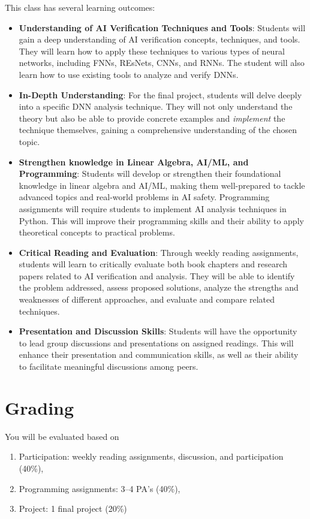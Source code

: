 \documentclass[11pt]{article}
\begin{document}
This class has several learning outcomes:
\begin{itemize}
\item \textbf{Understanding of AI Verification Techniques and Tools}: Students will gain a deep understanding of AI verification concepts, techniques, and tools. They will learn how to apply these techniques to various types of neural networks, including FNNs, REsNets, CNNs, and RNNs.  The student will also learn how to use existing tools to analyze and verify DNNs.

\item \textbf{In-Depth Understanding}: For the final project, students will delve deeply into a specific DNN analysis technique. They will not only understand the theory but also be able to provide concrete examples and \emph{implement} the technique themselves, gaining a comprehensive understanding of the chosen topic.  

\item \textbf{Strengthen knowledge in Linear Algebra, AI/ML, and Programming}: Students will develop or strengthen their foundational knowledge in linear algebra and AI/ML, making them well-prepared to tackle advanced topics and real-world problems in AI safety. 
Programming assignments will require students to implement AI analysis techniques in Python. This will improve their programming skills and their ability to apply theoretical concepts to practical problems.


\item \textbf{Critical Reading and Evaluation}: Through weekly reading assignments, students will learn to critically evaluate both book chapters and research papers related to AI verification and analysis. They will be able to identify the problem addressed, assess proposed solutions, analyze the strengths and weaknesses of different approaches, and evaluate and compare related techniques.

\item \textbf{Presentation and Discussion Skills}: Students will have the opportunity to lead group discussions and presentations on assigned readings. This will enhance their presentation and communication skills, as well as their ability to facilitate meaningful discussions among peers.

\end{itemize}

\section{Grading}
You will be evaluated based on
\begin{enumerate}
\item Participation:  weekly reading assignments, discussion, and participation (40\%),
\item Programming assignments: 3--4 PA's (40\%), 
\item Project: 1 final project  (20\%)
\end{enumerate}
\end{document}
